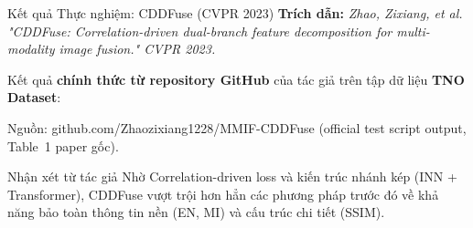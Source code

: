 \documentclass{beamer}
\begin{document}
\begin{frame}{Kết quả Thực nghiệm: CDDFuse (CVPR 2023)}
    \small
    \textbf{Trích dẫn:} \textit{Zhao, Zixiang, et al. "CDDFuse: Correlation-driven dual-branch feature decomposition for multi-modality image fusion." CVPR 2023.}

    \vspace{0.15cm}
    Kết quả \textbf{chính thức từ repository GitHub} của tác giả trên tập dữ liệu \textbf{TNO Dataset}:
    
    \vspace{0.1cm}
    \begin{table}
        \centering
        \renewcommand{\arraystretch}{1.2}
    \end{table}
    {\tiny Nguồn: github.com/Zhaozixiang1228/MMIF-CDDFuse (official test script output, Table~1 paper gốc).}

    \begin{block}{Nhận xét từ tác giả}
        Nhờ Correlation-driven loss và kiến trúc nhánh kép (INN + Transformer), CDDFuse vượt trội hơn hẳn các phương pháp trước đó về khả năng bảo toàn thông tin nền (EN, MI) và cấu trúc chi tiết (SSIM).
    \end{block}
\end{frame}
\end{document}
